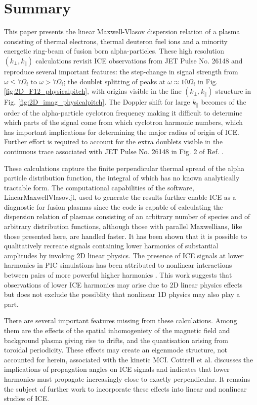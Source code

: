 \documentclass[12pt]{iopart}
\begin{document}
\section{Summary}

This paper presents the linear Maxwell-Vlasov dispersion relation of a plasma
consisting of thermal electrons, thermal deuteron fuel ions and a minority
energetic ring-beam of fusion born alpha-particles. These high resolution
$(k_\perp, k_\parallel)$ calculations revisit ICE observations from JET Pulse
No. 26148 \cite{Cottrell1993,Dendy1995} and reproduce several important features:
the step-change in signal strength from $\omega \leq 7\Omega_i$
to $\omega > 7\Omega_i$; the
doublet splitting of peaks at $\omega \approx 10\Omega_i$ in Fig.
\ref{fig:2D_F12_physicalpitch}, with origins visible in the fine $(k_\bot,
k_\parallel)$ structure in Fig. \ref{fig:2D_imag_physicalpitch}. The Doppler shift
for large $k_\parallel$ becomes of the order of the alpha-particle cyclotron
frequency making it difficult to determine which parts of the signal come
from which cyclotron harmonic numbers, which has important implications for
determining the major radius of origin of ICE.
Further effort is required to account for
the extra doublets visible in the continuous trace associated with JET Pulse No.
26148 in Fig. 2 of Ref. \cite{Cottrell1993}.


These calculations capture the finite perpendicular thermal spread of the alpha
particle distribution function, the integral of which has no known analytically
tractable form. The computational capabilities of the software,
LinearMaxwellVlasov.jl, used to generate the results further enable ICE as
a diagnostic for fusion plasmas since the code is capable of calculating the
dispersion relation of plasmas consisting of an arbitrary number of species and
of arbitrary distribution functions, although those with parallel Maxwellians,
like those presented here, are handled faster.
It has been shown that it is possible to
qualitatively recreate signals containing lower harmonics of substantial amplitudes by
invoking 2D linear physics. The presence of ICE signals at lower harmonics in
PIC simulations has been attributed to nonlinear interactions between pairs of
more powerful higher harmonics \cite{Carbajal2014}. This work suggests that
observations of lower ICE harmonics may arise due to 2D
linear physics effects but does not exclude the possiblity that nonlinear 1D
physics \cite{Chapman2018} may also play a part.

There are several important features missing from these calculations. Among them
are the effects of the spatial inhomogeniety of the magnetic field and background
plasma giving rise to drifts,
and the quantisation arising from toroidal periodicity. These
effects may create an eigenmode structure, not accounted for herein,
associated with the kinetic MCI.
Cottrell et al. \cite{Cottrell1993} discusses the implications of propagation
angles on ICE signals and indicates that lower harmonics must propagate
increasingly close to exactly perpendicular. It remains the subject of
further work to incorporate these effects into linear and nonlinear studies of ICE.
\end{document}
